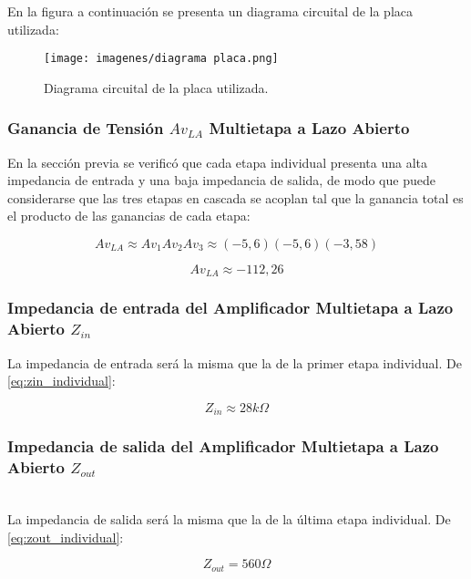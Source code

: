\documentclass[letterpaper, 10 pt, conference]{ieeeconf}  %
\begin{document}
En la figura a continuación se presenta un diagrama circuital de la placa utilizada:

\begin{figure}[H]
  \centering
  \texttt{[image: imagenes/diagrama placa.png]}
  \caption{Diagrama circuital de la placa utilizada.}
  \label{fig:diagramaplaca}
\end{figure}

\subsubsection{Ganancia de Tensión $Av_{LA}$ Multietapa a Lazo Abierto}

En la sección previa se verificó que cada etapa individual presenta una alta impedancia de entrada y una baja impedancia de salida, de modo que puede considerarse que las tres etapas en cascada se acoplan tal que la ganancia total es el producto de las ganancias de cada etapa:

\begin{equation}
Av_{LA} \approx Av_1  Av_2  Av_3 \approx (-5,6)(-5,6)(-3,58)
\end{equation}

\begin{equation}
Av_{LA} \approx -112,26
\end{equation}

\subsubsection{Impedancia de entrada del Amplificador Multietapa a Lazo Abierto $Z_{in}$}

La impedancia de entrada será la misma que la de la primer etapa individual. De \ref{eq:zin_individual}:

\begin{equation}
Z_{in} \approx 28k\Omega 
\end{equation}

\subsubsection{Impedancia de salida del Amplificador Multietapa a Lazo Abierto $Z_{out}$}\\

La impedancia de salida será la misma que la de la última etapa individual.  De \ref{eq:zout_individual}:

\begin{equation}
Z_{out} = 560\Omega
\end{equation}
\end{document}

